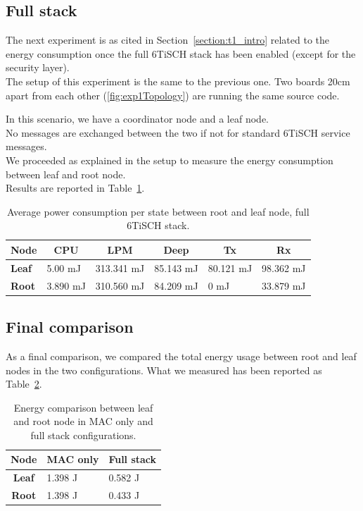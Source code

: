 \documentclass[conference]{IEEEtran}
\newcommand{\secref}[1]{Section~\ref{#1}}
\newcommand{\tabref}[1]{Table~\ref{#1}}
\renewcommand\_{\textunderscore\allowbreak}
\begin{document}
\subsection{Full stack}
The next experiment is as cited in \secref{section:t1_intro} related to the energy consumption once the full 6TiSCH stack has been enabled (except for the security layer).\\
The setup of this experiment is the same to the previous one.
Two boards 20cm apart from each other (\ref{fig:exp1Topology}) are running the same source code.

In this scenario, we have a coordinator node and a leaf node.\\
No messages are exchanged between the two if not for standard 6TiSCH service messages.\\
We proceeded as explained in the setup to measure the energy consumption between leaf and root node.\\
Results are reported in \tabref{tab:FullStack}.
\begin{table}[htbp]
	\centering
	\begin{tabular}{llllll}
		\hline
		\textbf{Node} &
		\multicolumn{1}{c}{\textbf{CPU}} &
		\multicolumn{1}{c}{\textbf{LPM}} &
		\multicolumn{1}{c}{\textbf{Deep}} &
		\multicolumn{1}{c}{\textbf{Tx}} &
		\multicolumn{1}{c}{\textbf{Rx}} \\ \hline
		\textbf{Leaf} &
		5.00 mJ &
		313.341 mJ &
		85.143 mJ &
		80.121 mJ &
		98.362 mJ \\
		\textbf{Root} &
		3.890 mJ &
		310.560 mJ &
		84.209 mJ &
		0 mJ &
		33.879 mJ \\ \hline
	\end{tabular}
	\caption{Average power consumption per state between root and leaf node, full 6TiSCH  stack.}
	\label{tab:FullStack}
\end{table}
\subsection{Final comparison}
As a final comparison, we compared the total energy usage between root and leaf nodes in the two configurations.
What we measured has been reported as \tabref{tab:exp1Comparison}.
\begin{table}[htbp]
	\centering
	\begin{tabular}{cll}
		\hline
		\textbf{Node} & \multicolumn{1}{c}{\textbf{MAC only}} & \multicolumn{1}{c}{\textbf{Full stack}} \\ \hline
		\textbf{Leaf} & 1.398 J                                & 0.582 J                                  \\
		\textbf{Root} & 1.398 J                                & 0.433 J                                  \\ \hline
	\end{tabular}
	\caption{Energy comparison between leaf and root node in MAC only and full stack configurations.}
	\label{tab:exp1Comparison}
\end{table}
\end{document}
